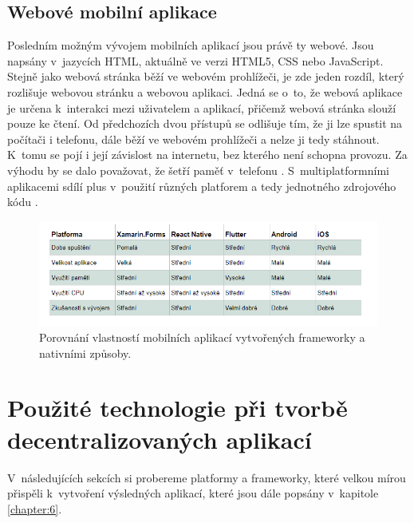 \section{Webové mobilní aplikace}
Posledním možným vývojem mobilních aplikací jsou právě ty webové. Jsou napsány v~jazycích HTML, aktuálně ve verzi HTML5, CSS nebo JavaScript. Stejně jako webová stránka běží ve webovém prohlížeči, je zde jeden rozdíl, který rozlišuje webovou stránku a webovou aplikaci. Jedná se o~to, že webová aplikace je určena k~interakci mezi uživatelem a aplikací, přičemž webová stránka slouží pouze ke čtení. Od předchozích dvou přístupů se odlišuje tím, že ji lze spustit na počítači i telefonu, dále běží ve webovém prohlížeči a nelze ji tedy stáhnout. K~tomu se pojí i její závislost na internetu, bez kterého není schopna provozu. Za výhodu by se dalo považovat, že šetří paměť v~telefonu \cite{web1}. S~multiplatformními aplikacemi sdílí plus v~použití různých platforem a tedy jednotného zdrojového kódu \cite{web2}.

\begin{figure}
\centering
\includegraphics[width=\textwidth]{obrazky/porovnani.png}
\caption{Porovnání vlastností mobilních aplikací vytvořených frameworky a nativními způsoby. \cite{AppsFrameworks}}
\label{fig:frameworks}
\end{figure}

\chapter{Použité technologie při tvorbě decentralizovaných aplikací}
\label{chapter:4}
V~následujících sekcích si probereme platformy a frameworky, které velkou mírou přispěli k~vytvoření výsledných aplikací, které jsou dále popsány v~kapitole \ref{chapter:6}.
